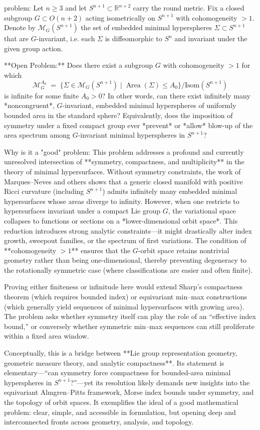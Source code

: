 problem:  
Let \( n \ge 3 \) and let \( S^{n+1} \subset \mathbb{R}^{n+2} \) carry the round metric.  
Fix a closed subgroup \( G \subset O(n+2) \) acting isometrically on \(S^{n+1}\) with cohomogeneity \(>1\).  
Denote by \(\mathcal{M}_G(S^{n+1})\) the set of embedded minimal hyperspheres \(\Sigma \subset S^{n+1}\) that are \(G\)-invariant, i.e. each \(\Sigma\) is diffeomorphic to \(S^n\) and invariant under the given group action.

**Open Problem:**  
Does there exist a subgroup \( G \) with cohomogeneity \(>1\) for which  
\[
\mathcal{M}_G^{A_0} \;=\; \{\Sigma \in \mathcal{M}_G(S^{n+1})\mid \operatorname{Area}(\Sigma)\le A_0\}/\mathrm{Isom}(S^{n+1})
\]
is infinite for some finite \( A_0>0 \)?  
In other words, can there exist infinitely many *noncongruent*, \(G\)-invariant, embedded minimal hyperspheres of uniformly bounded area in the standard sphere?  
Equivalently, does the imposition of symmetry under a fixed compact group ever *prevent* or *allow* blow-up of the area spectrum among \(G\)-invariant minimal hyperspheres in \(S^{n+1}\)?  

Why is it a "good" problem:  
This problem addresses a profound and currently unresolved intersection of **symmetry, compactness, and multiplicity** in the theory of minimal hypersurfaces.  
Without symmetry constraints, the work of Marques–Neves and others shows that a generic closed manifold with positive Ricci curvature (including \(S^{n+1}\)) admits infinitely many embedded minimal hypersurfaces whose areas diverge to infinity.  
However, when one restricts to hypersurfaces invariant under a compact Lie group \(G\), the variational space collapses to functions or sections on a *lower-dimensional orbit space*. This reduction introduces strong analytic constraints—it might drastically alter index growth, sweepout families, or the spectrum of first variations.  
The condition of **cohomogeneity \(>1\)** ensures that the \(G\)-orbit space retains nontrivial geometry rather than being one-dimensional, thereby preventing degeneracy to the rotationally symmetric case (where classifications are easier and often finite).  

Proving either finiteness or infinitude here would extend Sharp’s compactness theorem (which requires bounded index) or equivariant min–max constructions (which generally yield sequences of minimal hypersurfaces with growing area). The problem asks whether symmetry itself can play the role of an “effective index bound,” or conversely whether symmetric min–max sequences can still proliferate within a fixed area window.  

Conceptually, this is a bridge between **Lie group representation geometry, geometric measure theory, and analytic compactness**. Its statement is elementary—“can symmetry force compactness for bounded-area minimal hyperspheres in \(S^{n+1}\)?”—yet its resolution likely demands new insights into the equivariant Almgren–Pitts framework, Morse index bounds under symmetry, and the topology of orbit spaces.  
It exemplifies the ideal of a good mathematical problem: clear, simple, and accessible in formulation, but opening deep and interconnected fronts across geometry, analysis, and topology.
